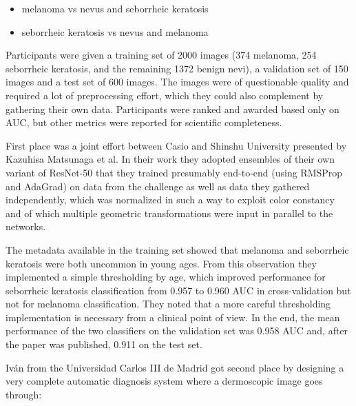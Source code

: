 \begin{itemize}
    \item melanoma vs nevus and seborrheic keratosis
    \item seborrheic keratosis vs nevus and melanoma
\end{itemize}

Participants were given a training set of 2000 images (374 melanoma, 254 seborrheic keratosis, and the remaining 1372 benign nevi), a validation set of 150 images and a test set of 600 images. The images were of questionable quality and required a lot of preprocessing effort, which they could also complement by gathering their own data. Participants were ranked and awarded based only on AUC, but other metrics were reported for scientific completeness.

First place was a joint effort between Casio and Shinshu University presented by Kazuhisa Matsunaga et al\cite{isic2017first}. In their work they adopted ensembles of their own variant of ResNet-50 that they trained presumably end-to-end (using RMSProp\cite{rmsprop} and AdaGrad\cite{adagrad}) on data from the challenge as well as data they gathered independently, which was normalized in such a way to exploit color constancy and of which multiple geometric transformations were input in parallel to the networks.

The metadata available in the training set showed that melanoma and seborrheic keratosis were both uncommon in young ages. From this observation they implemented a simple thresholding by age, which improved performance for seborrheic keratosis classification from 0.957 to 0.960 AUC in cross-validation but not for melanoma classification. They noted that a more careful thresholding implementation is necessary from a clinical point of view. In the end, the mean performance of the two classifiers on the validation set was 0.958 AUC and, after the paper was published, 0.911 on the test set.

Iván from the Universidad Carlos III de Madrid \cite{isic2017second} got second place by designing a very complete automatic diagnosis system where a dermoscopic image goes through:

